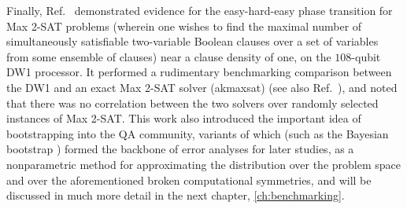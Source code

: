 Finally, Ref.~\cite{MAX2SAT} demonstrated evidence for the easy-hard-easy phase transition for Max 2-SAT problems (wherein one wishes to find the maximal number of simultaneously satisfiable two-variable Boolean clauses over a set of variables from some ensemble of clauses) near a clause density of one, on the $108$-qubit DW1 processor. It performed a rudimentary benchmarking comparison between the DW1 and an exact Max 2-SAT solver (akmaxsat) (see also Ref.~\cite{McGeoch}), and noted that there was no correlation between the two solvers over randomly selected instances of Max 2-SAT. This work also introduced the important idea of bootstrapping into the QA community, variants of which (such as the Bayesian bootstrap \cite{rubin1981bayesian}) formed the backbone of error analyses for later studies, as a nonparametric method for approximating the distribution over the problem space and over the aforementioned broken computational symmetries, and will be discussed in much more detail in the next chapter, \ref{ch:benchmarking}.
